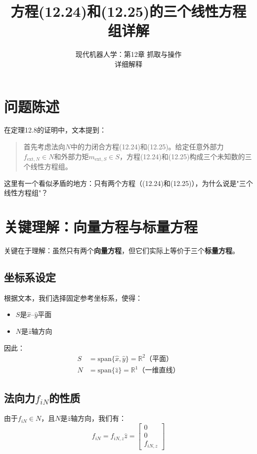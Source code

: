 \documentclass[12pt,a4paper]{article}
\title{方程(12.24)和(12.25)的三个线性方程组详解}
\author{现代机器人学：第12章 抓取与操作\\
详细解释}
\date{}
\begin{document}
\maketitle

\section{问题陈述}

在定理12.8的证明中，文本提到：

\begin{quote}
首先考虑法向$N$中的力闭合方程(12.24)和(12.25)。给定任意外部力$f_{\text{ext},N} \in N$和外部力矩$m_{\text{ext},S} \in S$，方程(12.24)和(12.25)构成三个未知数的三个线性方程组。
\end{quote}

这里有一个看似矛盾的地方：只有两个方程（(12.24)和(12.25)），为什么说是"三个线性方程组"？

\section{关键理解：向量方程与标量方程}

关键在于理解：虽然只有两个\textbf{向量方程}，但它们实际上等价于三个\textbf{标量方程}。

\subsection{坐标系设定}

根据文本，我们选择固定参考坐标系，使得：
\begin{itemize}
    \item $S$是$\hat{x}$--$\hat{y}$平面
    \item $N$是$\hat{z}$轴方向
\end{itemize}

因此：
\begin{align}
S &= \text{span}\{\hat{x}, \hat{y}\} = \mathbb{R}^2 \text{（平面）} \\
N &= \text{span}\{\hat{z}\} = \mathbb{R}^1 \text{（一维直线）}
\end{align}

\subsection{法向力$f_{iN}$的性质}

由于$f_{iN} \in N$，且$N$是$\hat{z}$轴方向，我们有：
\begin{equation}
f_{iN} = f_{iN,z} \hat{z} = \begin{bmatrix} 0 \\ 0 \\ f_{iN,z} \end{bmatrix}
\end{equation}
\end{document}
